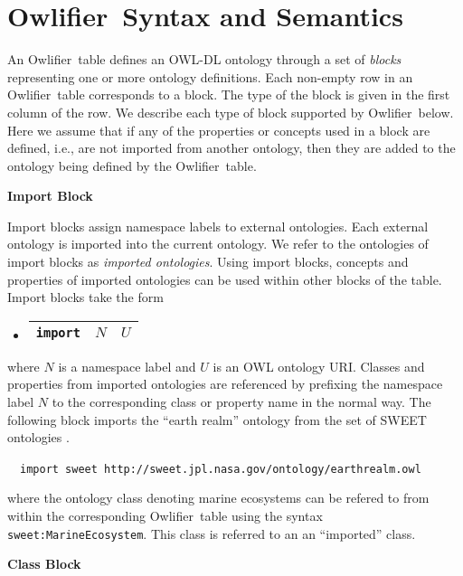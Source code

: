 \documentclass[preprint,number]{elsarticle}
\newcommand{\owlifier}{Owlifier}
\newcommand{\mypara}[1]{\vspace{12pt}\noindent\textbf{#1}}
\begin{document}
\section{\owlifier\ Syntax and Semantics}

An \owlifier\ table defines an OWL-DL
\cite{smith04:_owl_web_ontol_languag_guide} ontology through a set of
\emph{blocks} representing one or more ontology definitions.  Each
non-empty row in an \owlifier\ table corresponds to a block. The type
of the block is given in the first column of the row. We describe each
type of block supported by \owlifier\ below. Here we assume that if
any of the properties or concepts used in a block are defined, i.e.,
are not imported from another ontology, then they are added to the
ontology being defined by the \owlifier\ table.

\mypara{Import Block}  

\mypara{}Import blocks assign namespace labels to external
ontologies. Each external ontology is imported into the current
ontology. We refer to the ontologies of import blocks as
\emph{imported ontologies}.  Using import blocks, concepts and
properties of imported ontologies can be used within other blocks of
the table.  Import blocks take the form
\begin{itemize}
\item[]
  \begin{tabular}{|l|l|l|}\hline
    \texttt{import} & $\textit{N}$ & $\textit{U}$ \\ \hline 
  \end{tabular} 
\end{itemize}
where $\textit{N}$ is a namespace label and $\textit{U}$ is an OWL
ontology URI. Classes and properties from imported ontologies are
referenced by prefixing the namespace label $\textit{N}$ to the
corresponding class or property name in the normal way. The following
block imports the ``earth realm'' ontology from the set of SWEET
ontologies \cite{raskin:_seman_web_for_earth_and}.
\begin{tabbing}
  ~~\texttt{import sweet
    http://sweet.jpl.nasa.gov/ontology/earthrealm.owl}
\end{tabbing}
where the ontology class denoting marine ecosystems can be refered to
from within the corresponding \owlifier\ table using the syntax
\texttt{sweet:MarineEcosystem}. This class is referred to an an
``imported'' class.

\mypara{Class Block}  
\end{document}
